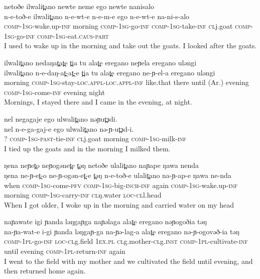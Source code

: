 \ex  netoðe ilwalit̪ano newte neme ego newte nanisalo	  \\ 
	\gll  n-e-toð-e ilwalit̪ano n-e-wt-e n-e-m-e ego n-e-wt-e na-ni-s-alo\\	
		  \textsc{comp-1sg}-wake.up-\textsc{inf} morning \textsc{comp-1sg}-go-\textsc{inf} \textsc{comp-1sg}-take-\textsc{inf} \textsc{cl}j.goat \textsc{comp-1sg}-go-\textsc{inf} \textsc{comp-1sg}-eat.\textsc{caus-part}  \\
		 \glt I used to wake up in the morning and take out the goats. I looked after the goats.  
		 	  	  
\ex  ilwalit̪ano nedaŋat̪at̪e t̪ia tu alat̪e eregano neɲela eregano uləngi 	  \\ 
	\gll  ilwalit̪ano n-e-daŋ-at̪-at̪-e t̪ia tu alat̪e eregano ne-ɲ-el-a eregano uləngi \\	
		  morning \textsc{comp-1sg}-stay-\textsc{loc.appl-loc.appl-inf} like.that there until (Ar.) evening \textsc{comp-1sg}-come-\textsc{inf} evening night \\
		 \glt Mornings, I stayed there and I came in the evening, at night.  
		 	  	  
\ex  nel negagaje ego ulwalit̪ano nəɲut̪ɜdi. 	  \\ 
	\gll  nel n-e-ga-gaj-e ego ulwalit̪ano nə-ɲ-ut̪ɜd-i. \\	
		  ? \textsc{comp-1sg-past}-tie-\textsc{inf} \textsc{cl}j.goat morning \textsc{comp-1sg}-milk-\textsc{inf}\\
		 \glt I tied up the goats and in the morning I milked them.  
		 	  	  
\ex  ŋena neɲet̪o neɲogənet̪e t̪əŋ netoðe ulalit̪ano naɲape ŋawa nenda 	  \\ 
	\gll  ŋena ne-ɲ-et̪-o ne-ɲ-ogən-et̪-e t̪əŋ n-e-toð-e ulalit̪ano na-ɲ-ap-e ŋawa ne-nda \\	
		  when \textsc{comp-1sg}-come-\textsc{pfv} \textsc{comp-1sg}-big-\textsc{inch-inf} again \textsc{comp-1sg}-wake.up-\textsc{inf} morning \textsc{comp-1sg}-carry-\textsc{inf} \textsc{cl}ŋ.water \textsc{loc-cl}l.head  \\
		 \glt When I got older, I woke up in the morning and carried water on my head 
		 
		 		 	  	  
\ex  naɲawate igi ɲanda ləŋgaɲga naɲəlaga alat̪e eregano nəɲogoðia təŋ	  \\ 
	\gll  na-ɲa-wat-e i-gi ɲanda ləŋgaɲ-ga na-ɲə-lag-a alat̪e eregano nə-ɲ-ogovəð-ia təŋ\\	
		  \textsc{comp-1pl}-go-\textsc{inf} \textsc{loc-cl}g.field \textsc{1ex.pl} \textsc{cl}g.mother-\textsc{cl}g.\textsc{inst} \textsc{comp-1pl}-cultivate-\textsc{inf} until evening \textsc{comp-1pl}-return-\textsc{inf} again\\
		 \glt I went to the field with my mother and we cultivated the field until evening, and then returned home again.  
		 		 	  	  
